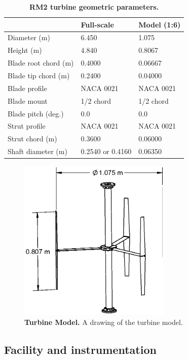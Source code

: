 \documentclass[10pt,letterpaper]{article}
\begin{document}
\begin{table}[ht]
\centering
\begin{tabular}{l|l|l}
   & Full-scale & Model (1:6) \\
\hline 
Diameter (m)   & 6.450 & 1.075 \\ 
Height (m)     & 4.840 & 0.8067 \\ 
Blade root chord (m) & 0.4000 & 0.06667 \\ 
Blade tip chord (m)  & 0.2400 & 0.04000 \\ 
Blade profile & NACA 0021 & NACA 0021 \\ 
Blade mount & 1/2 chord & 1/2 chord \\ 
Blade pitch (deg.) & 0.0 & 0.0 \\ 
Strut profile & NACA 0021 & NACA 0021 \\ 
Strut chord (m) & 0.3600 & 0.06000 \\ 
Shaft diameter (m) & 0.2540 \cite{Beam2011} or 0.4160 \cite{Hill2014} & 0.06350\\ 
\end{tabular}
\caption{\textbf{RM2 turbine geometric parameters.}}
\label{tab:turb-geom}
\end{table}

\begin{figure}[h]
\includegraphics[width=0.65\textwidth]{figures/turbine}
\caption{{\bf Turbine Model.}
A drawing of the turbine model.}
\label{fig:turbine-drawing}
\end{figure}


\subsection*{Facility and instrumentation}
\end{document}
